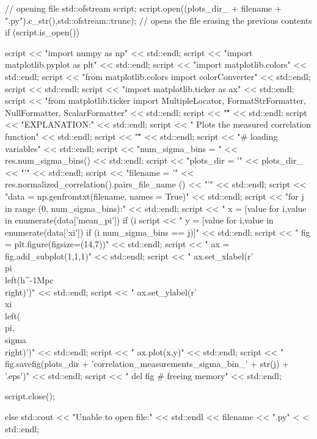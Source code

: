 \begin{DoxyCode}
{    // opening file
    std::ofstream script;
    script.open((plots_dir_ + filename + ".py").c_str(),std::ofstream::trunc); 
      // opens the file erasing the previous contents
    if (script.is_open()){
        script << "import numpy as np" << std::endl;
        script << "import matplotlib.pyplot as plt" << std::endl;
        script << "import matplotlib.colors" << std::endl;
        script << "from matplotlib.colors import colorConverter" << std::endl;
        script << std::endl;
        script << "import matplotlib.ticker as ax" << std::endl;
        script << "from matplotlib.ticker import MultipleLocator,
       FormatStrFormatter, NullFormatter, ScalarFormatter" << std::endl;
        script << "\"\"\"" << std::endl;
        script << "EXPLANATION:" << std::endl;
        script << "    Plots the measured correlation function" << std::endl;
        script << "\"\"\"" << std::endl;
        script << "# loading variables" << std::endl;
        script << "num_sigma_bins = " << res.num_sigma_bins() << std::endl;
        script << "plots_dir = '" << plots_dir_ << "'" << std::endl;
        script << "filename = '" << res.normalized_correlation().pairs_file_name
      () << "'" << std::endl;
        script << "data = np.genfromtxt(filename, names = True)" << std::endl;
        script << "for j in range (0, num_sigma_bins):" << std::endl;
        script << "    x = [value for i,value in enumerate(data['mean_pi']) if
       (i %
        script << "    y = [value for i,value in enumerate(data['xi']) if (i %
       num_sigma_bins == j)]" << std::endl;
        script << "    fig = plt.figure(figsize=(14,7))" << std::endl;
        script << "    ax = fig.add_subplot(1,1,1)" << std::endl;
        script << "    ax.set_xlabel(r'\\pi\\left(h^{-1}Mpc\\right)')" << 
      std::endl;
        script << "    ax.set_ylabel(r'\\xi\\left(\\pi, \\sigma\\right)')" << 
      std::endl;
        script << "    ax.plot(x,y)" << std::endl;
        script << "    fig.savefig(plots_dir +
       'correlation_measurements_sigma_bin_' + str(j) + '.eps')" << std::endl;
        script << "    del fig # freeing memory" << std::endl;
        
        script.close();
    }
    else{
        std::cout << "Unable to open file:" << std::endl << filename << ".py" <
      < std::endl;
    }
}
\end{DoxyCode}
